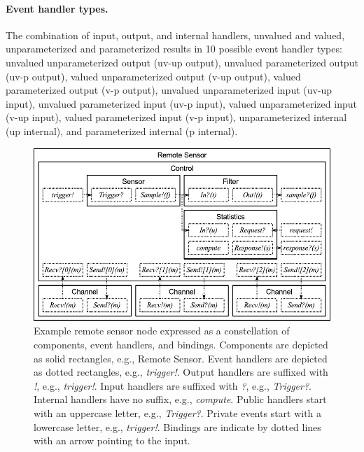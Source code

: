 \paragraph{Event handler types.}
The combination of input, output, and internal handlers, unvalued and valued, unparameterized and parameterized results in 10 possible event handler types:
unvalued unparameterized output (uv-up output),
unvalued parameterized output (uv-p output),
valued unparameterized output (v-up output),
valued parameterized output (v-p output),
unvalued unparameterized input (uv-up input),
unvalued parameterized input (uv-p input),
valued unparameterized input (v-up input),
valued parameterized input (v-p input),
unparameterized internal (up internal), and
parameterized internal (p internal).

\begin{figure}
\center
\includegraphics[width=\textwidth]{system_model}
\caption{Example remote sensor node expressed as a constellation of components, event handlers, and bindings.
  Components are depicted as solid rectangles, e.g., Remote Sensor.
  Event handlers are depicted as dotted rectangles, e.g., \emph{trigger!}.
  Output handlers are suffixed with \emph{!}, e.g., \emph{trigger!}.
  Input handlers are suffixed with \emph{?}, e.g., \emph{Trigger?}.
  Internal handlers have no suffix, e.g., \emph{compute}.
  Public handlers start with an uppercase letter, e.g., \emph{Trigger?}.
  Private events start with a lowercase letter, e.g., \emph{trigger!}.
  Bindings are indicate by dotted lines with an arrow pointing to the input.}
\label{sys_model}
\end{figure}

